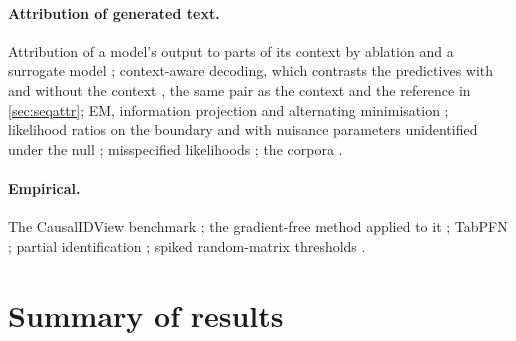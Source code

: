 \documentclass[11pt]{article}
\theoremstyle{definition}
\theoremstyle{remark}
\begin{document}
\paragraph{Attribution of generated text.} Attribution of a model's output to parts of its context by ablation and a surrogate model \cite{CohenWang2024}; context-aware decoding, which contrasts the predictives with and without the context \cite{Shi2024}, the same pair as the context and the reference in \cref{sec:seqattr}; EM, information projection and alternating minimisation \cite{DempsterLairdRubin1977,Csiszar1975,CsiszarTusnady1984}; likelihood ratios on the boundary and with nuisance parameters unidentified under the null \cite{Chernoff1954,SelfLiang1987,Davies1977}; misspecified likelihoods \cite{White1982}; the corpora \cite{BASIL2019,BABE2021}.
\paragraph{Empirical.} The CausalIDView benchmark \cite{Jung2026}; the gradient-free method applied
to it \cite[Section~51]{Awasthi-ThreeLayers}; TabPFN \cite{Hollmann2023}; partial
identification \cite{Manski1990}; spiked random-matrix thresholds \cite{BBP2005}.

\section{Summary of results}
\end{document}
